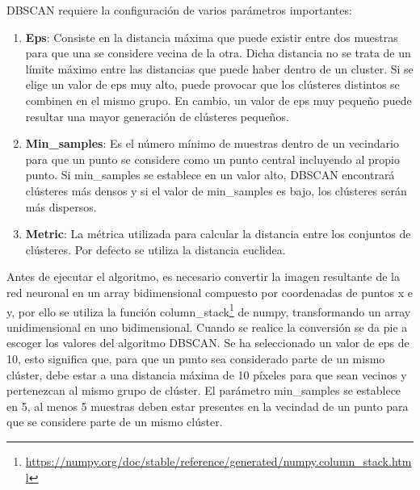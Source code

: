 DBSCAN requiere la configuración de varios parámetros importantes:
\begin{enumerate}
  \item \textbf{Eps}: Consiste en la distancia máxima que puede existir entre dos muestras para que una se considere vecina de la otra. Dicha distancia no se trata de un límite 
  máximo entre las distancias que puede haber dentro de un cluster. Si se elige un valor de eps muy alto, puede provocar que los clústeres distintos se combinen en el mismo grupo. 
  En cambio, un valor de eps muy pequeño puede resultar una mayor generación de clústeres pequeños.
  \item \textbf{Min\_samples}: Es el número mínimo de muestras dentro de un vecindario para que un punto se considere como un punto central incluyendo al propio punto.
  Si min\_samples se establece en un valor alto, DBSCAN encontrará clústeres más densos y 
  si el valor de min\_samples es bajo, los clústeres serán más dispersos.
  \item \textbf{Metric}: La métrica utilizada para calcular la distancia entre los conjuntos de clústeres. Por defecto se utiliza la distancia euclidea. 
\end{enumerate}

Antes de ejecutar el algoritmo, es necesario convertir la imagen resultante de la red neuronal en un array bidimensional compuesto por coordenadas de puntos x e y, por ello se utiliza
la función column\_stack\footnote{\url{https://numpy.org/doc/stable/reference/generated/numpy.column_stack.html}} de numpy, transformando un array
unidimensional en uno bidimensional. Cuando se realice la conversión se da pie a escoger los valores del algoritmo DBSCAN. Se ha seleccionado un valor de eps de 10, esto significa que, 
para que un punto sea considerado parte de un mismo clúster, debe estar a una distancia máxima de 10 píxeles para que sean vecinos y pertenezcan al mismo grupo de clúster. 
El parámetro min\_samples se establece en 5, al menos 5 muestras 
deben estar presentes en la vecindad de un punto para que se considere parte de un mismo clúster. 

